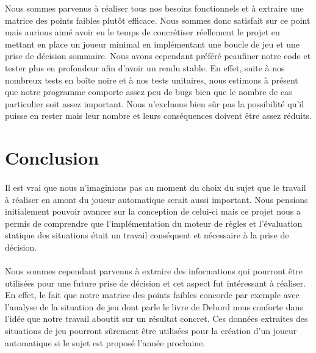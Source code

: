 		Nous sommes parvenus à réaliser tous nos besoins fonctionnels et à extraire une matrice des points faibles plutôt efficace. 
		Nous sommes donc satisfait sur ce point mais aurions aimé avoir eu le temps de concrétiser réellement le projet en mettant en place un joueur minimal
		en implémentant une boucle de jeu et une prise de décision sommaire. Nous avons cependant préféré peaufiner notre code et tester plus en profondeur 
		afin d'avoir un rendu stable.
		En effet, suite à nos nombreux tests en boîte noire et à nos tests unitaires, nous estimons à présent que notre programme comporte assez peu de bugs bien
		que le nombre de cas particulier soit assez important. Nous n'excluons bien sûr pas la possibilité qu'il puisse en rester mais leur nombre et leurs conséquences
		doivent être assez réduits.
		
	\clearpage

	\section{Conclusion}
	
		\paragraph{}
		Il est vrai que nous n'imaginions pas au moment du choix du sujet que le travail à réaliser en amont du joueur automatique serait aussi important.
		Nous pensions initialement pouvoir avancer sur la conception de celui-ci mais ce projet nous a permis de comprendre que l'implémentation du
		moteur de règles et l'évaluation statique des situations était un travail conséquent et nécessaire à la prise de décision.
		
		\paragraph{}
		Nous sommes cependant parvenus à extraire des informations qui pourront être utilisées pour une future prise de décision et cet aspect fut
		intéressant à réaliser. En effet, le fait que notre matrice des points faibles concorde par exemple avec l'analyse de la situation de jeu
		dont parle le livre de Debord \cite{ref1} nous conforte dans l'idée que notre travail aboutit sur un résultat concret.
		Ces données extraites des situations de jeu pourront sûrement être utilisées pour la création d'un joueur automatique si le sujet est proposé 
		l'année prochaine.
		
		
		
	\clearpage
